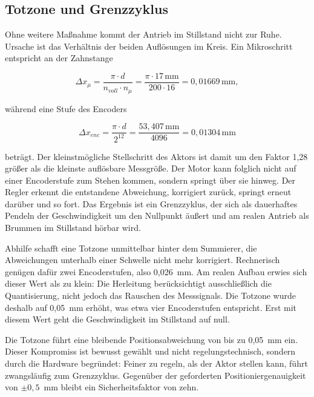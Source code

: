 \subsection*{Totzone und Grenzzyklus}

Ohne weitere Maßnahme kommt der Antrieb im Stillstand nicht zur Ruhe. Ursache ist das
Verhältnis der beiden Auflösungen im Kreis. Ein Mikroschritt entspricht an der Zahnstange

\begin{equation}
    \Delta x_{\mu} = \frac{\pi \cdot d}{n_{voll} \cdot n_{\mu}}
    = \frac{\pi \cdot 17\,\mathrm{mm}}{200 \cdot 16} = 0{,}01669\,\mathrm{mm} ,
    \label{eq:mikroschritt}
\end{equation}

während eine Stufe des Encoders

\begin{equation}
    \Delta x_{enc} = \frac{\pi \cdot d}{2^{12}}
    = \frac{53{,}407\,\mathrm{mm}}{4096} = 0{,}01304\,\mathrm{mm}
    \label{eq:encoderstufe}
\end{equation}

beträgt. Der kleinstmögliche Stellschritt des Aktors ist damit um den Faktor 1,28 größer
als die kleinste auflösbare Messgröße. Der Motor kann folglich nicht auf einer
Encoderstufe zum Stehen kommen, sondern springt über sie hinweg. Der Regler erkennt die
entstandene Abweichung, korrigiert zurück, springt erneut darüber und so fort. Das
Ergebnis ist ein Grenzzyklus, der sich als dauerhaftes Pendeln der Geschwindigkeit um den
Nullpunkt äußert und am realen Antrieb als Brummen im Stillstand hörbar wird.

Abhilfe schafft eine Totzone unmittelbar hinter dem Summierer, die Abweichungen unterhalb
einer Schwelle nicht mehr korrigiert. Rechnerisch genügen dafür zwei Encoderstufen, also
0,026~mm. Am realen Aufbau erwies sich dieser Wert als zu klein: Die Herleitung
berücksichtigt ausschließlich die Quantisierung, nicht jedoch das Rauschen des
Messsignals. Die Totzone wurde deshalb auf 0,05~mm erhöht, was etwa vier Encoderstufen
entspricht. Erst mit diesem Wert geht die Geschwindigkeit im Stillstand auf null.

Die Totzone führt eine bleibende Positionsabweichung von bis zu 0,05~mm ein. Dieser
Kompromiss ist bewusst gewählt und nicht regelungstechnisch, sondern durch die Hardware
begründet: Feiner zu regeln, als der Aktor stellen kann, führt zwangsläufig zum
Grenzzyklus. Gegenüber der geforderten Positioniergenauigkeit von $\pm 0{,}5$~mm bleibt
ein Sicherheitsfaktor von zehn.

